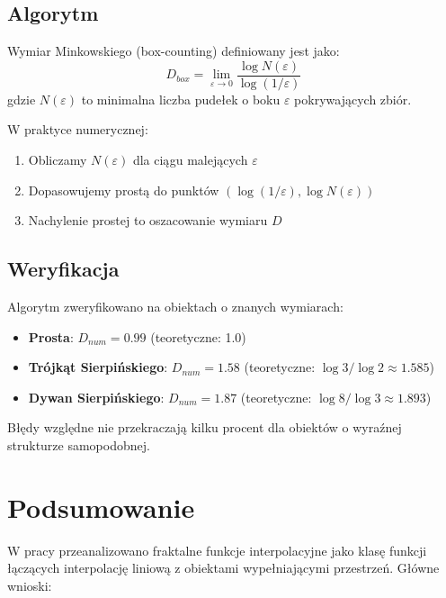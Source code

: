 \documentclass[11pt,a4paper]{article}
\begin{document}
\subsection{Algorytm}

Wymiar Minkowskiego (box-counting) definiowany jest jako:
\begin{equation}
D_{box} = \lim_{\varepsilon \to 0} \frac{\log N(\varepsilon)}{\log(1/\varepsilon)}
\label{eq:box_counting}
\end{equation}
gdzie $N(\varepsilon)$ to minimalna liczba pudełek o boku $\varepsilon$ pokrywających zbiór.

W praktyce numerycznej:
\begin{enumerate}
    \item Obliczamy $N(\varepsilon)$ dla ciągu malejących $\varepsilon$
    \item Dopasowujemy prostą do punktów $(\log(1/\varepsilon), \log N(\varepsilon))$
    \item Nachylenie prostej to oszacowanie wymiaru $D$
\end{enumerate}

\subsection{Weryfikacja}

Algorytm zweryfikowano na obiektach o znanych wymiarach:
\begin{itemize}
    \item \textbf{Prosta}: $D_{num} = 0.99$ (teoretyczne: 1.0)
    \item \textbf{Trójkąt Sierpińskiego}: $D_{num} = 1.58$ (teoretyczne: $\log 3/\log 2 \approx 1.585$)
    \item \textbf{Dywan Sierpińskiego}: $D_{num} = 1.87$ (teoretyczne: $\log 8/\log 3 \approx 1.893$)
\end{itemize}

Błędy względne nie przekraczają kilku procent dla obiektów o wyraźnej strukturze samopodobnej.

\section{Podsumowanie}

W pracy przeanalizowano fraktalne funkcje interpolacyjne jako klasę funkcji łączących interpolację liniową z obiektami wypełniającymi przestrzeń. Główne wnioski:
\end{document}

